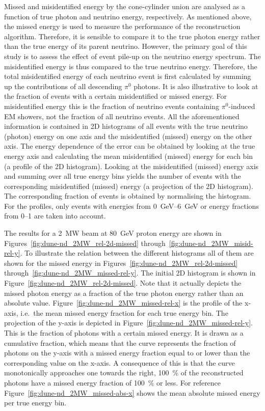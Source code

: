 \documentclass[a4paper]{article}
\begin{document}
Missed and misidentified energy by the cone-cylinder union are analysed as a function of true photon and neutrino energy, respectively.
As mentioned above, the missed energy is used to measure the performance of the reconstruction algorithm.
Therefore, it is sensible to compare it to the true photon energy rather than the true energy of its parent neutrino.
However, the primary goal of this study is to assess the effect of event pile-up on the neutrino energy spectrum.
The misidentified energy is thus compared to the true neutrino energy.
Therefore, the total misidentified energy of each neutrino event is first calculated by summing up the contributions of all descending $\pi^0$ photons.
It is also illustrative to look at the fraction of events with a certain misidentified or missed energy.
For misidentified energy this is the fraction of neutrino events containing $\pi^0$-induced EM showers, not the fraction of all neutrino events.
All the aforementioned information is contained in 2D histograms of all events with the true neutrino (photon) energy on one axis and the misidentified (missed) energy on the other axis.
The energy dependence of the error can be obtained by looking at the true energy axis and calculating the mean misidentified (missed) energy for each bin (a profile of the 2D histogram).
Looking at the misidentified (missed) energy axis and summing over all true energy bins yields the number of events with the corresponding misidentified (missed) energy (a projection of the 2D histogram).
The corresponding fraction of events is obtained by normalising the histogram.
For the profiles, only events with energies from \SIrange{0}{6}{\giga\electronvolt} or energy fractions from \numrange{0}{1} are taken into account.

The results for a \SI{2}{\mega\watt} beam at \SI{80}{\giga\electronvolt} proton energy are shown in Figures~\ref{fig:dune-nd_2MW_rel-2d-missed} through~\ref{fig:dune-nd_2MW_misid-rel-y}.
To illustrate the relation between the different histograms all of them are shown for the missed energy in Figures~\ref{fig:dune-nd_2MW_rel-2d-missed} through~\ref{fig:dune-nd_2MW_missed-rel-y}.
The initial 2D histogram is shown in Figure~\ref{fig:dune-nd_2MW_rel-2d-missed}.
Note that it actually depicts the missed photon energy as a fraction of the true photon energy rather than an absolute value.
Figure~\ref{fig:dune-nd_2MW_missed-rel-x} is the profile of the x-axis, i.e.\ the mean missed energy fraction for each true energy bin.
The projection of the y-axis is depicted in Figure~\ref{fig:dune-nd_2MW_missed-rel-y}.
This is the fraction of photons with a certain missed energy.
It is drawn as a cumulative fraction, which means that the curve represents the fraction of photons on the y-axis with a missed energy fraction equal to or lower than the corresponding value on the x-axis.
A consequence of this is that the curve monotonically approaches one towards the right, \SI{100}{\percent} of the reconstructed photons have a missed energy fraction of \SI{100}{\percent} or less.
For reference Figure~\ref{fig:dune-nd_2MW_missed-abs-x} shows the mean absolute missed energy per true energy bin.
\end{document}
